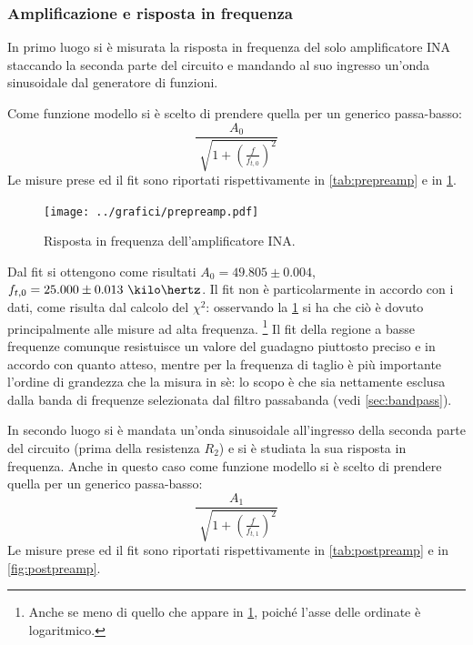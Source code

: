 \documentclass[a4paper,10pt]{article}
\begin{document}
\subsubsection*{Amplificazione e risposta in frequenza}
\vspace*{-5pt}
In primo luogo si è misurata la risposta in frequenza del solo amplificatore INA staccando la seconda parte del circuito e mandando al suo ingresso un'onda sinusoidale dal generatore di funzioni.
 
Come funzione modello si è scelto di prendere quella per un generico passa-basso:
\vspace*{-5pt}
\begin{equation}
\frac{A_0}{\sqrt[]{1+(\frac{f}{f_{t,0}})^2}}
\end{equation}
\vspace*{-5pt}
Le misure prese ed il fit sono riportati rispettivamente in \cref{tab:prepreamp} e in \cref{fig:prepreamp}.

\vspace*{-8pt}
\begin{figure}[H]
	\centering
	\texttt{[image: ../grafici/prepreamp.pdf]}
	\vspace*{-10pt}
	\caption{Risposta in frequenza dell'amplificatore INA.}
	\label{fig:prepreamp}
\end{figure}
\vspace*{-10pt}

Dal fit si ottengono come risultati $A_0 = 49.805 \pm 0.004$, $f_{t,0} = 25.000 \pm 0.013~\kilo\hertz$. Il fit non è particolarmente in accordo con i dati, come risulta dal calcolo del $ \chi^2 $: osservando la \cref{fig:prepreamp} si ha che ciò è dovuto principalmente alle misure ad alta frequenza.
\footnote{Anche se meno di quello che appare in \cref{fig:prepreamp}, poiché l'asse delle ordinate è logaritmico.}
Il fit della regione a basse frequenze comunque resistuisce un valore del guadagno piuttosto preciso e in accordo con quanto atteso, mentre per la frequenza di taglio è più importante l'ordine di grandezza che la misura in sè: lo scopo è che sia nettamente esclusa dalla banda di frequenze selezionata dal filtro passabanda (vedi \cref{sec:bandpass}).

In secondo luogo si è mandata un'onda sinusoidale all'ingresso della seconda parte del circuito (prima della resistenza $R_2$) e si è studiata la sua risposta in frequenza.
Anche in questo caso come funzione modello si è scelto di prendere quella per un generico passa-basso:
\vspace*{-5pt}
\begin{equation}
\frac{A_1}{\sqrt[]{1+(\frac{f}{f_{t,1}})^2}}
\end{equation}
\vspace*{-5pt}
 Le misure prese ed il fit sono riportati rispettivamente in \cref{tab:postpreamp} e in \cref{fig:postpreamp}.
 
\end{document}
